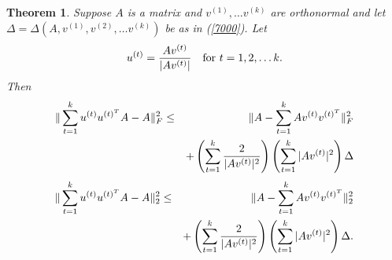 \documentclass{book}
\newtheorem{theorem}{Theorem}[chapter]
\numberwithin{exercise}{chapter}
\begin{document}
\begin{theorem}\label{invariant3}
Suppose $A$ is a matrix and $v^{(1)},\ldots v^{(k)}$ are orthonormal and let
$\Delta=\Delta(A,v^{(1)},v^{(2)},\ldots v^{(k)})$ be as in (\ref{7000}). Let
$$u^{(t)} = {Av^{(t)}\over |Av^{(t)}|}\quad\hbox{for } t=1,2,\ldots k.$$
Then
\begin{eqnarray*}
\|\sum_{t=1}^k u^{(t)}u^{(t)^T}A-A\|_F^2 &\le& \|A-\sum_{t=1}^k Av^{(t)}v^{(t)^T}\|^2_F\\
&&+\left(\sum_{t=1}^k{2\over |Av^{(t)}|^2}\right)\left(\sum_{t=1}^k |Av^{(t)}|^2\right)
 \Delta
\end{eqnarray*}
\begin{eqnarray*}
\|\sum_{t=1}^k u^{(t)}u^{(t)^T}A-A\|_2^2 &\le&    \|A-\sum_{t=1}^k Av^{(t)}v^{(t)^T}\|_2^2\\
&&+\left(\sum_{t=1}^k{2\over |Av^{(t)}|^2}\right)\left(\sum_{t=1}^k |Av^{(t)}|^2\right)
\Delta.
\end{eqnarray*}
\end{theorem}
\end{document}
